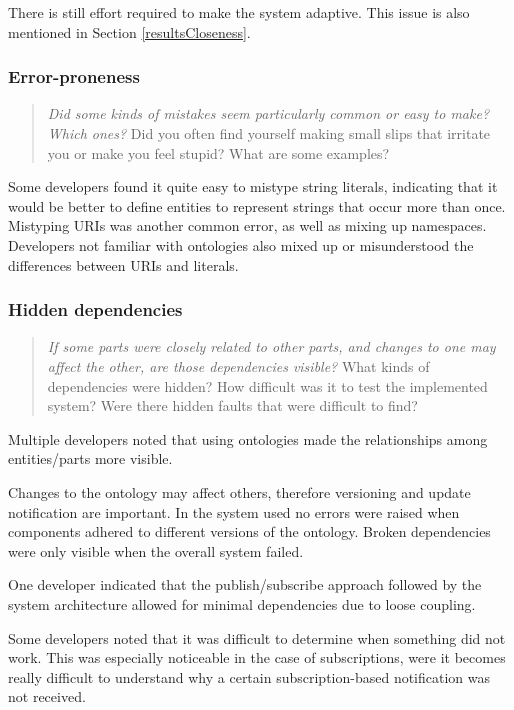 There is still effort required to make the system adaptive. This issue is also mentioned in Section \ref{resultsCloseness}.


\subsubsection{Error-proneness}

\begin{quote}
	\emph{Did some kinds of mistakes seem particularly common or easy to make? Which ones?}
	Did you often find yourself making small slips that irritate you or make you feel stupid? What are some examples?
\end{quote}

Some developers found it quite easy to mistype string literals, indicating that it would be better to define entities to represent strings that occur more than once. Mistyping URIs was another common error, as well as mixing up namespaces. Developers not familiar with ontologies also mixed up or misunderstood the differences between URIs and literals.

\subsubsection{Hidden dependencies}

\begin{quote}
	\emph{If some parts were closely related to other parts, and changes to one may affect the other, are those dependencies visible?}
	What kinds of dependencies were hidden? How difficult was it to test the implemented system? Were there hidden faults that were difficult to find?
\end{quote}

Multiple developers noted that using ontologies made the relationships among entities/parts more visible. 

Changes to the ontology may affect others, therefore versioning and update notification are important. In the system used no errors were raised when components adhered to different versions of the ontology. Broken dependencies were only visible when the overall system failed.

One developer indicated that the publish/subscribe approach followed by the system architecture allowed for minimal dependencies due to loose coupling.

Some developers noted that it was difficult to determine when something did not work. This was especially noticeable in the case of subscriptions, were it becomes really difficult to understand why a certain subscription-based notification was not received.

